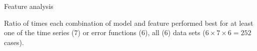 \documentclass{beamer}
\begin{document}
\begin{frame}{Feature analysis}


Ratio of times each combination of model and feature performed best for at least one of the time series (7) or error functions (6), all (6) data sets ($ 6\times 7\times 6 = 252$  cases).

\end{frame}
\end{document}
